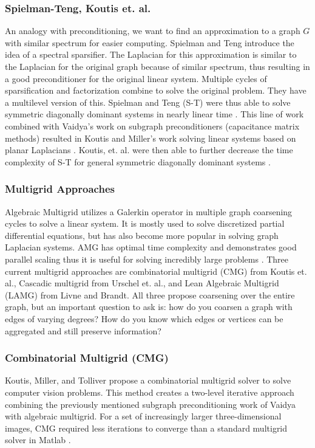 \documentclass{article}
\begin{document}
\subsubsection{Spielman-Teng, Koutis et. al.}
An analogy with preconditioning, we want to find an approximation to a graph $G$ with similar spectrum for easier computing. Spielman and Teng introduce the idea of a spectral sparsifier. The Laplacian for this approximation is similar to the Laplacian for the original graph because of similar spectrum, thus resulting in a good preconditioner for the original linear system. Multiple cycles of sparsification and factorization combine to solve the original problem. They have a multilevel version of this. Spielman and Teng (S-T) were thus able to solve symmetric diagonally dominant systems in nearly linear time \cite{Spielman:2008}.  This line of work combined with Vaidya's \cite{Vaidya:1991} work on subgraph preconditioners (capacitance matrix methods) resulted in Koutis and Miller's work solving linear systems based on planar Laplacians \cite{Koutis:2007}. Koutis, et. al. were then able to further decrease the time complexity of S-T for general symmetric diagonally dominant systems \cite{Koutis:2010}.

\subsubsection{Multigrid Approaches}
Algebraic Multigrid utilizes a Galerkin operator in multiple graph coarsening cycles to solve a linear system. It is mostly used to solve discretized partial differential equations, but has also become more popular in solving graph Laplacian systems. AMG has optimal time complexity and demonstrates good parallel scaling thus it is useful for solving incredibly large problems \cite{Livne:2012}. Three current multigrid approaches are combinatorial multigrid (CMG) from Koutis et. al., Cascadic multigrid from Urschel et. al., and Lean Algebraic Multigrid (LAMG) from Livne and Brandt. All three propose coarsening over the entire graph, but an important question to ask is: how do you coarsen a graph with edges of varying degrees? How do you know which edges or vertices can be aggregated and still preserve information?


\subsubsection{Combinatorial Multigrid (CMG)}
Koutis, Miller, and Tolliver propose a combinatorial multigrid solver to solve computer vision problems. This method creates a two-level iterative approach combining the previously mentioned subgraph preconditioning work of Vaidya with algebraic multigrid. For a set of increasingly larger three-dimensional images, CMG required less iterations to converge than a standard multigrid solver in Matlab \cite{Koutis:2011}.
\end{document}
